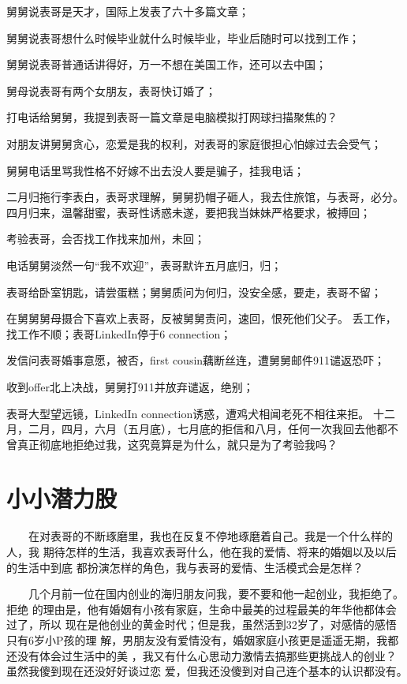 \documentclass[12pt]{book}
\begin{document}
舅舅说表哥是天才，国际上发表了六十多篇文章；

舅舅说表哥想什么时候毕业就什么时候毕业，毕业后随时可以找到工作；

舅舅说表哥普通话讲得好，万一不想在美国工作，还可以去中国；

舅母说表哥有两个女朋友，表哥快订婚了；

打电话给舅舅，我提到表哥一篇文章是电脑模拟打网球扫描聚焦的？

对朋友讲舅舅贪心，恋爱是我的权利，对表哥的家庭很担心怕嫁过去会受气；

舅舅电话里骂我性格不好嫁不出去没人要是骗子，挂我电话；

二月归拖行李表白，表哥求理解，舅舅扔帽子砸人，我去住旅馆，与表哥，必分。
\linebreak
\linebreak
四月归来，温馨甜蜜，表哥性诱惑未遂，要把我当妹妹严格要求，被搏回；

考验表哥，会否找工作找来加州，未回；

电话舅舅淡然一句“我不欢迎”，表哥默许五月底归，归；

表哥给卧室钥匙，请尝蛋糕；舅舅质问为何归，没安全感，要走，表哥不留；

在舅舅舅母摄合下喜欢上表哥，反被舅舅责问，速回，恨死他们父子。
\linebreak
\linebreak
丢工作，找工作不顺；表哥LinkedIn停于6 connection；

发信问表哥婚事意愿，被否，first cousin藕断丝连，遭舅舅邮件911谴返恐吓；

收到offer北上决战，舅舅打911并放弃谴返，绝别；

表哥大型望远镜，LinkedIn connection诱惑，遭鸡犬相闻老死不相往来拒。
\linebreak
\linebreak
十二月，二月，四月，六月（五月底），七月底的拒信和八月，任何一次我回去他都不曾真正彻底地拒绝过我，这究竟算是为什么，就只是为了考验我吗？
\section{小小潜力股}
\label{sec-8-34}

　　在对表哥的不断琢磨里，我也在反复不停地琢磨着自己。我是一个什么样的人，我
期待怎样的生活，我喜欢表哥什么，他在我的爱情、将来的婚姻以及以后的生活中到底
都扮演怎样的角色，我与表哥的爱情、生活模式会是怎样？

　　几个月前一位在国内创业的海归朋友问我，要不要和他一起创业，我拒绝了。拒绝
的理由是，他有婚姻有小孩有家庭，生命中最美的过程最美的年华他都体会过了，所以
现在是他创业的黄金时代；但是我，虽然活到32岁了，对感情的感悟只有6岁小P孩的理
解，男朋友没有爱情没有，婚姻家庭小孩更是遥遥无期，我都还没有体会过生活中的美
，我又有什么心思动力激情去搞那些更挑战人的创业？虽然我傻到现在还没好好谈过恋
爱，但我还没傻到对自己连个基本的认识都没有。　
\end{document}
